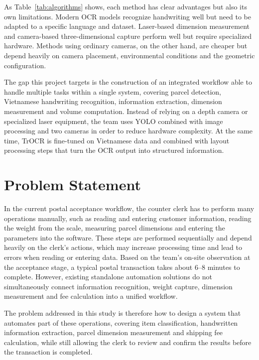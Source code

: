 As Table~\ref{tab:algorithms} shows, each method has clear advantages but also its own limitations. Modern OCR models \cite{li2023trocr} recognize handwriting well but need to be adapted to a specific language and dataset. Laser-based dimension measurement \cite{fernandes2006, peng2020} and camera-based three-dimensional capture \cite{lethai2019} perform well but require specialized hardware. Methods using ordinary cameras, on the other hand, are cheaper but depend heavily on camera placement, environmental conditions and the geometric configuration.

The gap this project targets is the construction of an integrated workflow able to handle multiple tasks within a single system, covering parcel detection, Vietnamese handwriting recognition, information extraction, dimension measurement and volume computation. Instead of relying on a depth camera or specialized laser equipment, the team uses YOLO combined with image processing and two cameras in order to reduce hardware complexity. At the same time, TrOCR is fine-tuned on Vietnamese data and combined with layout processing steps that turn the OCR output into structured information.


\section{Problem Statement}
\label{sec:problem_statement}

In the current postal acceptance workflow, the counter clerk has to perform many operations manually, such as reading and entering customer information, reading the weight from the scale, measuring parcel dimensions and entering the parameters into the software. These steps are performed sequentially and depend heavily on the clerk's actions, which may increase processing time and lead to errors when reading or entering data. Based on the team's on-site observation at the acceptance stage, a typical postal transaction takes about 6--8 minutes to complete. However, existing standalone automation solutions do not simultaneously connect information recognition, weight capture, dimension measurement and fee calculation into a unified workflow.

The problem addressed in this study is therefore how to design a system that automates part of these operations, covering item classification, handwritten information extraction, parcel dimension measurement and shipping fee calculation, while still allowing the clerk to review and confirm the results before the transaction is completed.

